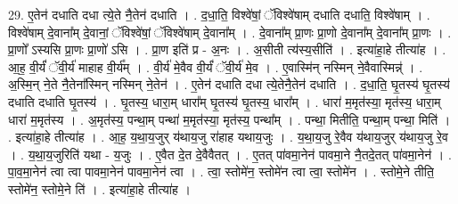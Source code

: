 \documentclass[17pt]{extarticle}
\begin{document}
29. ए॒तेन॑ दधाति दधा त्ये॒ते नै॒तेन॑ दधाति । . द॒धा॒ति॒ विश्वे॑षां॒ ॅविश्वे॑षाम् दधाति दधाति॒ विश्वे॑षाम् । . विश्वे॑षाम् दे॒वाना᳚म् दे॒वानां॒ ॅविश्वे॑षां॒ ॅविश्वे॑षाम् दे॒वाना᳚म् । . दे॒वाना᳚म् प्रा॒णः प्रा॒णो दे॒वाना᳚म् दे॒वाना᳚म् प्रा॒णः । . प्रा॒णो᳚ ऽस्यसि प्रा॒णः प्रा॒णो॑ ऽसि । . प्रा॒ण इति॑ प्र - अ॒नः । . अ॒सीती त्य॑स्य॒सीति॑ । . इत्या॑हा॒हे तीत्या॑ह । . आ॒ह॒ वी॒र्यं॑ ॅवी॒र्य॑ माहाह वी॒र्य᳚म् । . वी॒र्य॑ मे॒वैव वी॒र्यं॑ ॅवी॒र्य॑ मे॒व । . ए॒वास्मि॑न् नस्मिन् ने॒वैवास्मिन्न्॑ । . अ॒स्मि॒न् ने॒ते नै॒तेना᳚स्मिन् नस्मिन् ने॒तेन॑ । . ए॒तेन॑ दधाति दधा त्ये॒तेनै॒तेन॑ दधाति । . द॒धा॒ति॒ घृ॒तस्य॑ घृ॒तस्य॑ दधाति दधाति घृ॒तस्य॑ । . घृ॒तस्य॒ धारा॒म् धारा᳚म् घृ॒तस्य॑ घृ॒तस्य॒ धारा᳚म् । . धारा॑ म॒मृत॑स्या॒ मृत॑स्य॒ धारा॒म् धारा॑ म॒मृत॑स्य । . अ॒मृत॑स्य॒ पन्था॒म् पन्था॑ म॒मृत॑स्या॒ मृत॑स्य॒ पन्था᳚म् । . पन्था॒ मितीति॒ पन्था॒म् पन्था॒ मिति॑ । . इत्या॑हा॒हे तीत्या॑ह । . आ॒ह॒ य॒था॒य॒जुर् य॑थाय॒जु रा॑हाह यथाय॒जुः । . य॒था॒य॒जु रे॒वैव य॑थाय॒जुर् य॑थाय॒जु रे॒व । . य॒था॒य॒जुरिति॑ यथा - य॒जुः । . ए॒वैत दे॒त दे॒वैवैतत् । . ए॒तत् पा॑वमा॒नेन॑ पावमा॒ने नै॒तदे॒तत् पा॑वमा॒नेन॑ । . पा॒व॒मा॒नेन॑ त्वा त्वा पावमा॒नेन॑ पावमा॒नेन॑ त्वा । . त्वा॒ स्तोमे॑न॒ स्तोमे॑न त्वा त्वा॒ स्तोमे॑न । . स्तोमे॒ने तीति॒ स्तोमे॑न॒ स्तोमे॒ने ति॑ । . इत्या॑हा॒हे तीत्या॑ह । \newline
\end{document}

